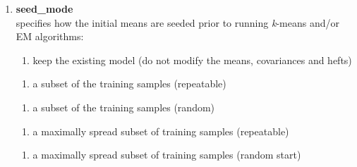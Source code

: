 \begin{enumerate}[{$\bullet$}]
\begin{small}
\begin{enumerate}[{-}]
\item
{\bf seed\_mode}\\
specifies how the initial means are seeded prior to running \mbox{{\it k}-means} and/or EM algorithms:
\begin{small}
\begin{enumerate}
\item keep the existing model (do not modify the means, covariances and hefts)
\end{enumerate}
\begin{enumerate}
\item a subset of the training samples (repeatable)
\end{enumerate}
\begin{enumerate}
\item a subset of the training samples (random)
\end{enumerate}
\begin{enumerate}
\item a maximally spread subset of training samples (repeatable)
\end{enumerate}
\begin{enumerate}
\item a maximally spread subset of training samples (random start) \\
\end{enumerate}
\end{small}



\end{enumerate}
\end{small}
\end{enumerate}
